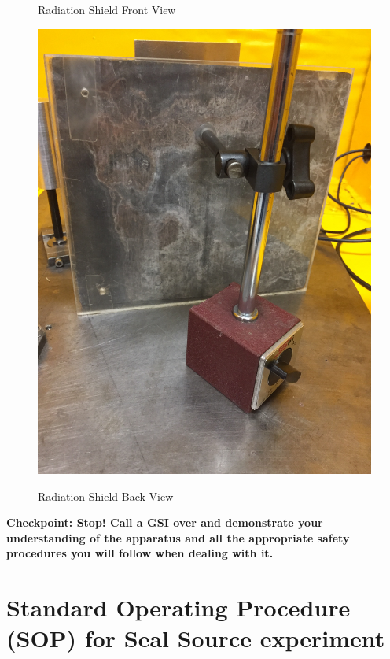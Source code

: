 \documentclass{../lab}
\begin{document}
\begin{figure}[H]
\begin{minipage}{.49\linewidth}
    \caption{Radiation Shield Front View}
\end{minipage}\hfill
\begin{minipage}{.49\linewidth}
    \centering
    \href{http://experimentationlab.berkeley.edu/sites/default/files/Shield-Back.JPG}{\includegraphics[width=\linewidth,keepaspectratio]{images/Shield-Back.JPG}} \\
    \caption{Radiation Shield Back View}
\end{minipage} 
\end{figure}

\textbf{Checkpoint: Stop! Call a GSI over and demonstrate your understanding of the apparatus and all the appropriate safety procedures you will follow when dealing with it.}

\section{Standard Operating Procedure (SOP) for Seal Source experiment}
\end{document}
